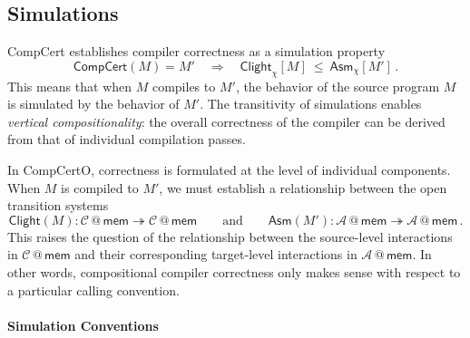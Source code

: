 \documentclass[acmsmall,screen,review,anonymous]{acmart}
\newcommand{\kw}[1]{\ensuremath{ \mathsf{#1} }}
\begin{document}


\subsection{Simulations} %


CompCert establishes compiler correctness
as a simulation property
\[
  \kw{CompCert}(M) = M'
  \quad\Rightarrow\quad
  \kw{Clight}_\chi[M] \:\le\: \kw{Asm}_\chi[M']
  \,.
\]
This means that when $M$ compiles to $M'$,
the behavior of the source program $M$
is simulated by the behavior of $M'$.
The transitivity of simulations enables
\emph{vertical compositionality}:
the overall correctness of the compiler
can be derived from that of
individual compilation passes.

In CompCertO,
correctness is formulated at the level of
individual components.
When $M$ is compiled to $M'$,
we must establish a relationship between
the open transition systems
\[
  \kw{Clight}(M) :
    \mathcal{C} \mathbin@ \kw{mem} \twoheadrightarrow
    \mathcal{C} \mathbin@ \kw{mem}
  \qquad \text{and} \qquad
  \kw{Asm}(M') :
    \mathcal{A} \mathbin@ \kw{mem} \twoheadrightarrow
    \mathcal{A} \mathbin@ \kw{mem}
  \,.
\]
This raises the question of the relationship
between the source-level interactions
in $\mathcal{C} \mathbin@ \kw{mem}$
and their corresponding target-level interactions
in $\mathcal{A} \mathbin@ \kw{mem}$.
In other words,
compositional compiler correctness only makes sense
with respect to a particular calling convention.

\paragraph{Simulation Conventions}
\end{document}
